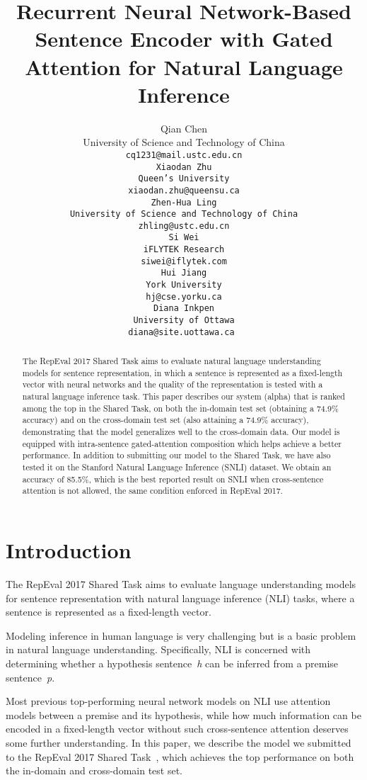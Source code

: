 \documentclass[11pt,letterpaper]{article}
\title{Recurrent Neural Network-Based Sentence Encoder with Gated Attention for Natural Language Inference}
\author{
Qian Chen \\
University of Science and  
Technology of China\\
\tt{cq1231@mail.ustc.edu.cn} \\\And
Xiaodan Zhu \\
Queen's University \\
\tt{xiaodan.zhu@queensu.ca} \\\AND
Zhen-Hua Ling \\
University of Science and
Technology of China\\
\tt{zhling@ustc.edu.cn} \\\And
Si Wei \\
iFLYTEK Research\\
\tt{siwei@iflytek.com} \\\AND
Hui Jiang \\
York University\\
\tt{hj@cse.yorku.ca} \\\And 
Diana Inkpen \\
University of Ottawa\\
\tt{diana@site.uottawa.ca}
}
\date{}
\begin{document}
\maketitle

\begin{abstract}
The RepEval 2017 Shared Task aims to evaluate natural language understanding models for sentence representation, in which a sentence is represented as a fixed-length vector with neural networks and the quality of the representation is tested with a natural language inference task. This paper describes our system (alpha) that is ranked among the top in the Shared Task, on both the in-domain test set (obtaining a 74.9\% accuracy) and on the cross-domain test set (also attaining a 74.9\% accuracy), demonstrating that the model generalizes well to the cross-domain data. Our model is equipped with intra-sentence gated-attention composition which helps achieve a better performance. In addition to submitting our model to the Shared Task, we have also tested it on the Stanford Natural Language Inference (SNLI) dataset. We obtain an accuracy of 85.5\%, which is the best reported result on SNLI when cross-sentence attention is not allowed, the same condition enforced in RepEval 2017.

\end{abstract}

\section{Introduction}
The RepEval 2017 Shared Task aims to evaluate language understanding models for sentence representation with natural language inference (NLI) tasks, where a sentence is represented as a fixed-length vector. 

Modeling inference in human language is very challenging but is a basic problem in natural language understanding. Specifically, NLI is concerned with determining whether a hypothesis sentence~\textit{h} can be inferred from a premise sentence~\textit{p}.

Most previous top-performing neural network models on NLI use attention models between a premise and its hypothesis, while how much information can be encoded in a fixed-length vector without such cross-sentence attention deserves some further understanding. In this paper, we describe the model we submitted to the RepEval 2017 Shared Task~\citep{nangia2017repeval}, which achieves the top performance on both the in-domain and cross-domain test set. 
\end{document}
